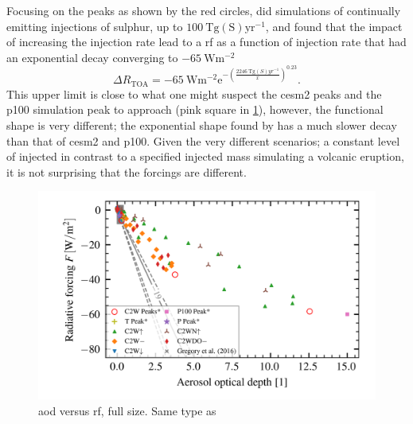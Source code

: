 \documentclass{ametsocV5}
\newcommand{\iso}[1][i]{{#1}njected \ce{SO2}}
\begin{document}
Focusing on the peaks as shown by the red circles, \citet{niemeier2015} did simulations
of continually emitting injections of sulphur, up to \( \SI{100}{\tera\gram
  \mathrm{(S)}\mathrm{yr}^{-1}} \), and found that the impact of increasing the injection
rate lead to a \ac{rf} as a function of injection rate that had an exponential decay
converging to \( \SI{-65}{\watt\meter^{-2}} \)
\begin{equation}
  \Delta
  R_{\mathrm{TOA}} =
  -\SI{65}{\watt\metre^{-2}}
  \mathrm{e}^{-\left(\frac{\SI{2246}{\tera\gram(S)yr^{-1}}}{x}\right)^{0.23}}.
  \label{eq:niemeier_exponential}
\end{equation}
%
This upper limit is close to what one might suspect the \ac{cesm2} peaks and the
\ac{p100} simulation peak to approach (pink square in \cref{fig:aod_vs_toa_full}),
however, the functional shape is very different; the exponential shape found by
\citet{niemeier2015} has a much slower decay than that of \ac{cesm2} and \ac{p100}.
Given the very different scenarios; a constant level of \iso{} in contrast to a
specified injected mass simulating a volcanic eruption, it is not surprising that the
forcings are different.

\begin{figure}[t]
  \begin{center}
    \includegraphics[width=0.95\linewidth]{figures/aod_vs_toa_avg_full.png}
  \end{center}
  \caption{\ac{aod} versus \ac{rf}, full size. Same type as
    \citet{gregory2016}}%
  \label{fig:aod_vs_toa_full}
\end{figure}
\end{document}
